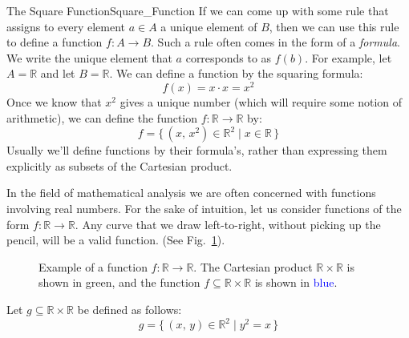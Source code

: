         \begin{lexample}{The Square Function}{Square_Function}
            If we can come up with some rule that assigns to every element
            $a\in{A}$ a unique element of $B$, then we can use this rule to
            define a function $f:A\rightarrow{B}$. Such a rule often comes
            in the form of a \textit{formula}. We write the
            unique element that $a$ corresponds to as $f(b)$. For example, let
            $A=\mathbb{R}$ and let $B=\mathbb{R}$. We can define a function by
            the squaring formula:
            \begin{equation}
                f(x)=x\cdot{x}=x^{2}
            \end{equation}
            Once we know that $x^{2}$ gives a unique number
            (which will require some notion of arithmetic), we can define
            the function $f:\mathbb{R}\rightarrow\mathbb{R}$ by:
            \begin{equation}
                f=\{\,(x,\,x^{2})\in\mathbb{R}^{2}\;|\;x\in\mathbb{R}\,\}
            \end{equation}
            Usually we'll define functions by their formula's, rather than
            expressing them explicitly as subsets of the Cartesian product.
        \end{lexample}
        In the field of mathematical analysis we are often concerned with
        functions involving real numbers. For the sake of intuition, let
        us consider functions of the form $f:\mathbb{R}\rightarrow\mathbb{R}$.
        Any curve that we draw left-to-right, without picking up the pencil,
        will be a valid function.
        (See Fig.~\ref{fig:Function_R_to_R_Subset_Cart_Prod}).
        \begin{figure}[H]
            \centering
            
            \caption[Example of a Function $f:\mathbb{R}\rightarrow\mathbb{R}$]
                    {Example of a function $f:\mathbb{R}\rightarrow\mathbb{R}$.
                     The Cartesian product $\mathbb{R}\times\mathbb{R}$ is
                     shown in \textcolor{green!80!black}{green}, and the
                     function $f\subseteq\mathbb{R}\times\mathbb{R}$ is shown
                     in \textcolor{blue}{blue}.}
            \label{fig:Function_R_to_R_Subset_Cart_Prod}
        \end{figure}
        Let $g\subseteq\mathbb{R}\times\mathbb{R}$ be defined as follows:
        \begin{equation}
            g=\big\{\,(x,\,y)\in\mathbb{R}^{2}\;|\;y^{2}=x\,\big\}
        \end{equation}
